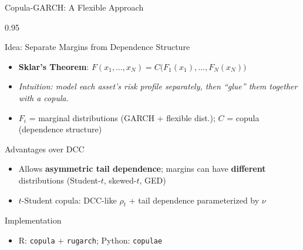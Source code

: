 \documentclass[9pt, aspectratio=169, t]{beamer}
\begin{document}
\begin{frame}{Copula-GARCH: A Flexible Approach}
    \begin{cminipage}{0.95\textwidth}
    \vspace{-3mm}
    {\scriptsize
    \begin{block}{Idea: Separate Margins from Dependence Structure}
        \begin{itemize}\setlength{\itemsep}{0pt}
            \item \textbf{Sklar's Theorem}: $F(x_1, \ldots, x_N) = C\big(F_1(x_1), \ldots, F_N(x_N)\big)$
            \item \textit{Intuition: model each asset's risk profile separately, then ``glue'' them together with a copula.}
            \item $F_i$ = marginal distributions (GARCH + flexible dist.); $C$ = copula (dependence structure)
        \end{itemize}
    \end{block}
    \vspace{-1mm}
    \begin{block}{Advantages over DCC}
        \begin{itemize}\setlength{\itemsep}{0pt}
            \item Allows \textbf{asymmetric tail dependence}; margins can have \textbf{different} distributions (Student-$t$, skewed-$t$, GED)
            \item $t$-Student copula: DCC-like $\rho_t$ + tail dependence parameterized by $\nu$
        \end{itemize}
    \end{block}
    \vspace{-1mm}
    \begin{alertblock}{Implementation}
        \begin{itemize}\setlength{\itemsep}{0pt}
            \item R: \texttt{copula} + \texttt{rugarch}; Python: \texttt{copulae}
        \end{itemize}
    \end{alertblock}
    }
    \end{cminipage}
\end{frame}
\end{document}
